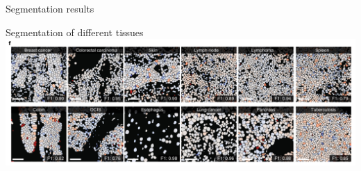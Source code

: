 \documentclass[9pt, aspectratio=169]{beamer}
\begin{document}
\begin{frame}
    {Segmentation results}
    \centering
\end{frame}

\begin{frame}
    {Segmentation of different tissues}
    \centering
    \includegraphics[width=\textwidth]{Greenwald2021_various_tissues.png}
\end{frame}
\end{document}

